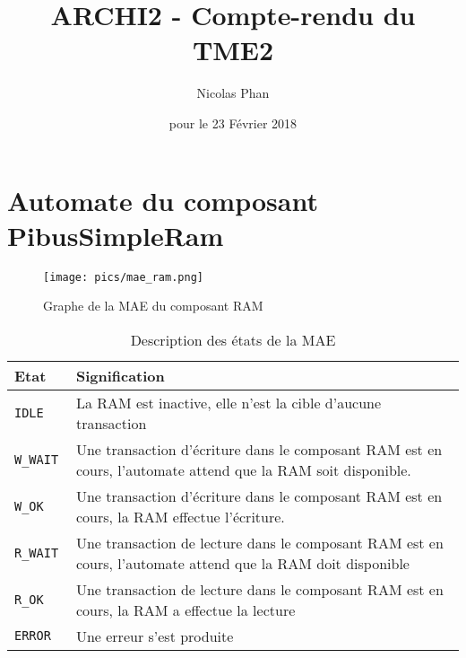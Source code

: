 \documentclass{article}
\title{ARCHI2 - Compte-rendu du TME2}
\author{Nicolas Phan}
\date{pour le 23 Février 2018}
\begin{document}
\pagestyle{headings}
\maketitle
\tableofcontents
\newpage



\section{Automate du composant PibusSimpleRam}

\begin{figure}[H]
\texttt{[image: pics/mae\_ram.png]}
\centering
\caption{Graphe de la MAE du composant RAM}
\label{mae_ram}
\end{figure}

\begin{table}[H]
\centering
\begingroup
\setlength{\tabcolsep}{5pt}
\renewcommand{\arraystretch}{1.1}
\begin{tabular}{| l | p{15cm} |}
\hline
Etat    & Signification \\
\hline
\tt{IDLE}    & La RAM est inactive, elle n'est la cible d'aucune transaction \\
\hline
\tt{W\_WAIT}   & Une transaction d'écriture dans le composant RAM est en cours,
        l'automate attend que la RAM soit disponible. \\
\hline
\tt{W\_OK}     & Une transaction d'écriture dans le composant RAM est en cours,
        la RAM effectue l'écriture. \\
\hline
\tt{R\_WAIT}   & Une transaction de lecture dans le composant RAM est en cours,
        l'automate attend que la RAM doit disponible \\
\hline
\tt{R\_OK}     & Une transaction de lecture dans le composant RAM est en cours,
        la RAM a effectue la lecture \\
\hline
\tt{ERROR}   & Une erreur s'est produite \\
\hline
\end{tabular}
\caption{Description des états de la MAE}
\endgroup
\end{table}


\end{document}
